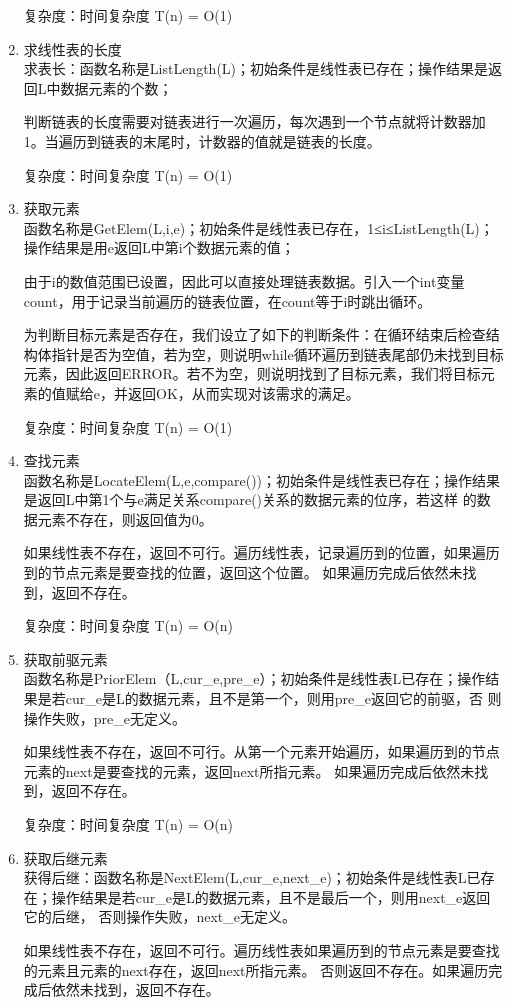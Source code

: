 \documentclass[supercite]{Experimental_Report}
\theoremstyle{definition}
\begin{document}
\begin{enumerate}
	复杂度：时间复杂度 T(n) = O(1)
	\item 求线性表的长度\\
	求表长：函数名称是ListLength(L)；初始条件是线性表已存在；操作结果是返回L中数据元素的个数；
	
	判断链表的长度需要对链表进行一次遍历，每次遇到一个节点就将计数器加1。当遍历到链表的末尾时，计数器的值就是链表的长度。
	
	复杂度：时间复杂度 T(n) = O(1)
	\item 获取元素\\
函数名称是GetElem(L,i,e)；初始条件是线性表已存在，1≤i≤ListLength(L)；操作结果是用e返回L中第i个数据元素的值；

由于i的数值范围已设置，因此可以直接处理链表数据。引入一个int变量count，用于记录当前遍历的链表位置，在count等于i时跳出循环。

为判断目标元素是否存在，我们设立了如下的判断条件：在循环结束后检查结构体指针是否为空值，若为空，则说明while循环遍历到链表尾部仍未找到目标元素，因此返回ERROR。若不为空，则说明找到了目标元素，我们将目标元素的值赋给e，并返回OK，从而实现对该需求的满足。

复杂度：时间复杂度 T(n) = O(1)
	\item 查找元素\\
	函数名称是LocateElem(L,e,compare())；初始条件是线性表已存在；操作结果是返回L中第1个与e满足关系compare()关系的数据元素的位序，若这样
	的数据元素不存在，则返回值为0。
	
	如果线性表不存在，返回不可行。遍历线性表，记录遍历到的位置，如果遍历到的节点元素是要查找的位置，返回这个位置。
	如果遍历完成后依然未找到，返回不存在。
	
	复杂度：时间复杂度 T(n) = O(n)
	\item 获取前驱元素\\
	函数名称是PriorElem（L,cur\_e,pre\_e）；初始条件是线性表L已存在；操作结果是若cur\_e是L的数据元素，且不是第一个，则用pre\_e返回它的前驱，否
	则操作失败，pre\_e无定义。
	
	如果线性表不存在，返回不可行。从第一个元素开始遍历，如果遍历到的节点元素的next是要查找的元素，返回next所指元素。
	如果遍历完成后依然未找到，返回不存在。
	
	复杂度：时间复杂度 T(n) = O(n)
	\item  获取后继元素\\
	获得后继：函数名称是NextElem(L,cur\_e,next\_e)；初始条件是线性表L已存在；操作结果是若cur\_e是L的数据元素，且不是最后一个，则用next\_e返回它的后继，
	否则操作失败，next\_e无定义。
	
	如果线性表不存在，返回不可行。遍历线性表如果遍历到的节点元素是要查找的元素且元素的next存在，返回next所指元素。
	否则返回不存在。如果遍历完成后依然未找到，返回不存在。
	

\end{enumerate}
\end{document}
